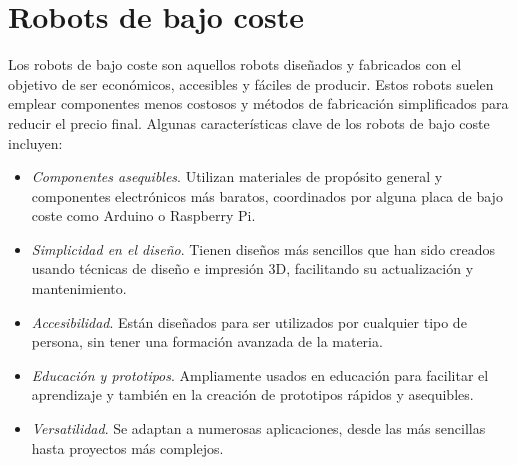 \setcounter{footnote}{18} %
\setcounter{footnote}{19} %
\setcounter{footnote}{20} %
\setcounter{footnote}{21} %


\section{Robots de bajo coste}
\label{sec:robotbajocoste}

Los robots de bajo coste son aquellos robots diseñados y fabricados con el objetivo de ser económicos, accesibles y fáciles de producir. Estos robots suelen emplear componentes menos costosos y métodos de fabricación simplificados para reducir el precio final. Algunas características clave de los robots de bajo coste incluyen:

\begin{itemize}
	\item \textit{Componentes asequibles}. Utilizan materiales de propósito general y componentes electrónicos más baratos, coordinados por alguna placa de bajo coste como Arduino o Raspberry Pi.
	\item \textit{Simplicidad en el diseño}. Tienen diseños más sencillos que han sido creados usando técnicas de diseño e impresión 3D, facilitando su actualización y mantenimiento.
	\item \textit{Accesibilidad}. Están diseñados para ser utilizados por cualquier tipo de persona, sin tener una formación avanzada de la materia.
	\item \textit{Educación y prototipos}. Ampliamente usados en educación para facilitar el aprendizaje y también en la creación de prototipos rápidos y asequibles.
	\item \textit{Versatilidad}. Se adaptan a numerosas aplicaciones, desde las más sencillas hasta proyectos más complejos.
	
\end{itemize}\


